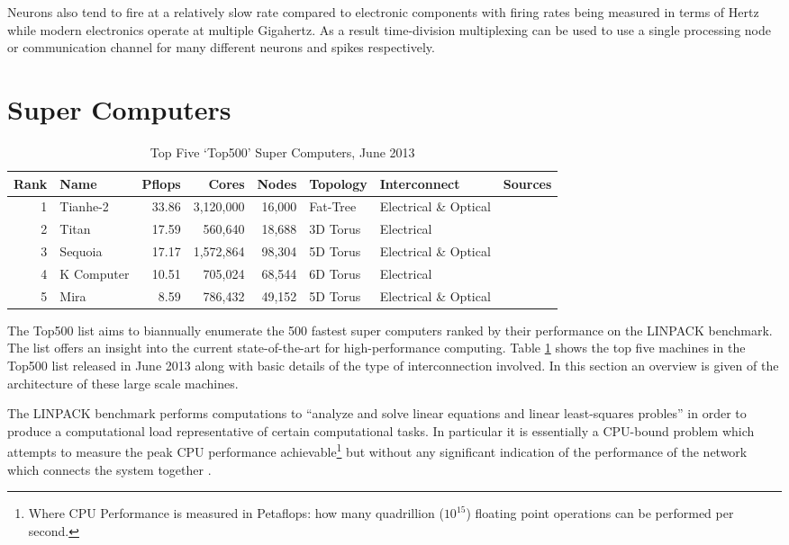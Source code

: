 			Neurons also tend to fire at a relatively slow rate compared to electronic
			components with firing rates being measured in terms of Hertz while modern
			electronics operate at multiple Gigahertz. As a result time-division
			multiplexing can be used to use a single processing node or communication
			channel for many different neurons and spikes respectively.
	
	
	\section{Super Computers}
		
		\begin{table}
			\center
			\begin{tabular}{r l r r r l l l}
				\toprule
				Rank & Name    & Pflops& Cores  & Nodes  & Topology & Interconnect          & Sources \\
				\midrule                          
				1 & Tianhe-2   & 33.86 & 3,120,000 & 16,000 & Fat-Tree & Electrical \& Optical & \cite{dongarra13} \\
				2 & Titan      & 17.59 & 560,640   & 18,688 & 3D Torus & Electrical            & \cite{bland12} \\
				3 & Sequoia    & 17.17 & 1,572,864 & 98,304 & 5D Torus & Electrical \& Optical & \cite{prickett10} \\
				4 & K Computer & 10.51 & 705,024   & 68,544 & 6D Torus & Electrical            & \cite{fujitsu11,yokokawa11} \\
				5 & Mira       &  8.59 & 786,432   & 49,152 & 5D Torus & Electrical \& Optical & \cite{prickett10} \\
				\bottomrule
			\end{tabular}
			
			\caption{Top Five `Top500' Super Computers, June 2013 \cite{meuer13}}
			\label{tab:top500}
		\end{table}
		
		The Top500 list \cite{meuer13} aims to biannually enumerate the 500 fastest
		super computers ranked by their performance on the LINPACK
		\cite{dongarraLINPAC} benchmark. The list offers an insight into the current
		state-of-the-art for high-performance computing. Table \ref{tab:top500}
		shows the top five machines in the Top500 list released in June 2013 along
		with basic details of the type of interconnection involved. In this section
		an overview is given of the architecture of these large scale machines.
		
		The LINPACK benchmark performs computations to ``analyze and solve linear
		equations and linear least-squares probles'' \cite{dongarra84} in order to
		produce a computational load representative of certain computational tasks.
		In particular it is essentially a CPU-bound problem which attempts to
		measure the peak CPU performance achievable\footnote{Where CPU Performance
		is measured in Petaflops: how many quadrillion ($10^{15}$) floating point
		operations can be performed per second.} but without any significant
		indication of the performance of the network which connects the system
		together \cite{dongarra07}.
		
